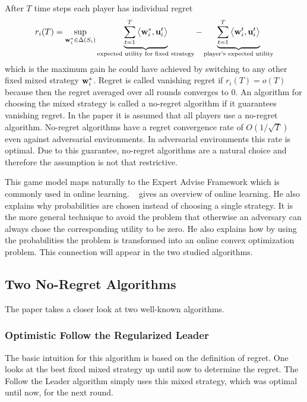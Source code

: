 \documentclass[a4paper]{article}
\theoremstyle{definition}
\renewcommand{\vec}[1]{\ensuremath{{\bf #1}}}
\newcommand{\dotp}[2]{\ensuremath{\left\langle #1, #2 \right\rangle}}
\begin{document}
After $T$ time steps each player has individual regret 
\begin{equation*}
r_i(T)
= \sup_{\vec{w}_i^*\in \Delta(S_i)} \underbrace{\sum_{t=1}^{T}
  \dotp{\vec{w}_i^*}{ \vec{u}_i^t}}_{\text{expected utility for fixed
    strategy}} -\underbrace{\sum_{t=1}^{T} \dotp{\vec{w}_i^t}{
    \vec{u}_i^t}}_{\text{player's expected utility}} 
\end{equation*}
which is the maximum gain he could have achieved by
switching to any other fixed mixed strategy $\vec{w}_i^*$.
Regret is called vanishing regret if $r_i(T) = o(T)$ because then the regret averaged
over all rounds converges to 0.
An algorithm for choosing the mixed strategy is called a no-regret algorithm if it guarantees vanishing
regret.
In the paper it is assumed that all players use a no-regret algorithm.
No-regret algorithms have a regret convergence rate of $O(1/\sqrt{T})$
even against adversarial environments.
In adversarial environments this rate is optimal.
Due to this guarantee, no-regret algorithms are a natural choice and
therefore the assumption is not that restrictive.

This game model maps naturally to the Expert Advise Framework which is
commonly used in online learning.
\citeauthor[]{Foundations}~\cite{Foundations} gives an overview of online learning.
He also explains why probabilities are chosen instead of choosing a
single strategy.
It is the more general technique to avoid the problem that otherwise
an adversary can always chose the corresponding utility to be zero.
He also explains how by using the probabilities the problem is
transformed into an online convex optimization problem.
This connection will appear in the two studied algorithms.



\subsection{Two No-Regret Algorithms}
\label{sec:two-no-regret}

The paper takes a closer look at two well-known algorithms.

\subsubsection{Optimistic Follow the Regularized Leader}
\label{sec:optim-foll-regul}
The basic intuition for this algorithm is based on the definition of
regret.
One looks at the best fixed mixed strategy up until now to determine
the regret.
The Follow the Leader algorithm simply uses this mixed strategy, which was optimal until now, for
the next round.
\end{document}
